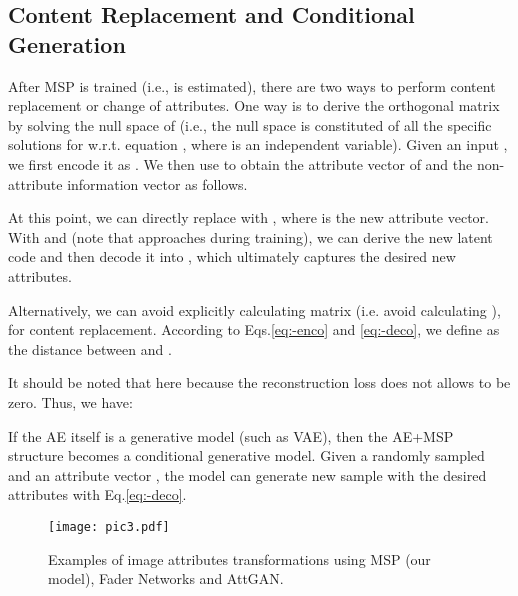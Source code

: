 \documentclass{article}
\begin{document}
\subsection{Content Replacement and Conditional Generation}
After MSP is trained (i.e.,  is estimated), there are two ways to perform content replacement or change of attributes. One way is to derive the orthogonal matrix  by solving the null space   of  (i.e., the null space is constituted of all the specific solutions for  w.r.t. equation , where  is an independent variable). Given an input , we first encode it as . We then use  to obtain the attribute vector  of  and the non-attribute information vector  as follows.

At this point, we can directly replace  with , where  is the new attribute vector. With  and  (note that  approaches   during training), we can derive the new latent code  and then decode it into , which ultimately captures the desired new attributes. 


Alternatively, we can avoid explicitly calculating  matrix  (i.e. avoid calculating ), for content replacement. According to Eqs.\ref{eq:-enco} and \ref{eq:-deco}, we define  as the distance between  and .

It should be noted that here  because the reconstruction loss does not allows  to be zero. Thus, we have:



If the AE itself is a generative model (such as VAE), then the AE+MSP structure becomes a conditional generative model. Given a randomly sampled  and an attribute vector , the model can  generate new sample  with the desired attributes with Eq.\ref{eq:-deco}.


























\begin{figure*}[!ht]
\centering



    \texttt{[image: pic3.pdf]}\vspace{-2ex}
    \caption{Examples of image attributes transformations using MSP (our model), Fader Networks and AttGAN.}
    \label{fig:pic_g_1}
\end{figure*}
\end{document}
